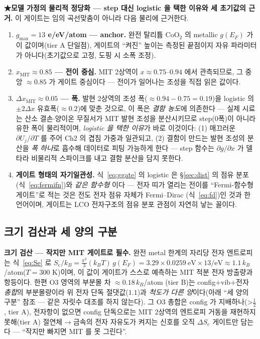 \textbf{★모델 가정의 물리적 정당화 --- step 대신 logistic 을 택한 이유와 세 초기값의 근거.} 이 게이트는 임의 곡선맞춤이 아니라
다음 물리에 근거한다.
\begin{enumerate}[label=(\roman*),leftmargin=2.2em,itemsep=2pt]
\item \textbf{$g_{\max}=13$ e/eV/atom --- anchor.} 완전 탈리튬 $\mathrm{CoO_2}$ 의 metallic $g(E_F)$ 가 이 값이며(tier A 단일점)\cite{motohashi2009}, 게이트의
``켜진'' 높이는 측정된 끝점이지 자유 파라미터가 아니다(초기값으로 고정, 도핑 시 소폭 조정).
\item \textbf{$x_\mathrm{MIT}\approx0.85$ --- 전이 중심.} MIT 2상역이 $x\approx0.75$--$0.94$ 에서 관측되므로\cite{menetrier1999,reimers1992},
그 중앙 $\approx0.85$ 가 게이트 중심이다 --- 전이가 일어나는 조성을 직접 읽은 값이다.
\item \textbf{$\Delta x_\mathrm{MIT}\approx0.05$ --- 폭.} 발현 2상역의 조성 폭($\approx0.94{-}0.75=0.19$)을 logistic 의 $\pm2\Delta x$ 유효폭($\approx0.2$)에 맞춘
것으로, 이 폭은 \emph{결함 농도}에 의존한다 --- 실제 시료는 산소 결손$\cdot$양이온 무질서가 MIT 발현 조성을
분산시키므로 step(0폭)이 아니라 유한 폭이 물리적이며, \emph{logistic 을 택한 이유}가 바로 이것이다: (1) 매끄러운
$\partial U_j/\partial T$ 를 주어 Ch2 의 겹침 가중과 일관되고, (2) 결함이 만드는 발현 조성의 분산을 \emph{폭
하나}로 흡수해 데이터로 피팅 가능하게 한다 --- step 함수는 $\partial g/\partial x$ 가 델타라 비물리적 스파이크를
내고 결함 분산을 담지 못한다.
\item \textbf{게이트 형태의 자기일관성.} 식~\eqref{eq:ggate} 의 logistic 은 \S\ref{sec:dist} 의 점유 분포(식~\eqref{eq:fermifn})와 \emph{같은 함수형}
이다 --- 전자 띠가 열리는 전이를 ``Fermi-함수형 게이트''로 적는 것은 전도 전자 점유 자체가 Fermi--Dirac
(식~\eqref{eq:fd})인 것과 한 언어이며, 게이트는 LCO 전자구조의 점유 분포 관점이 자연히 낳는 꼴이다.
\end{enumerate}

\subsection{크기 검산과 세 양의 구분}\label{sec:lco-Se-scale}
\textbf{크기 검산 --- 작지만 MIT 게이트로 필수.} 완전 metal 한계의 자리당 전자 엔트로피는 식~\eqref{eq:Se} 로 $S_e/k_B=\tfrac{\pi^2}{3}(k_BT)\,g(E_F)
=3.29\times0.0259\ \mathrm{eV}\times13/\mathrm{eV}\approx1.1\,k_B$/atom($T{=}300$ K)이며, 이 값이 게이트가
스스로 예측하는 MIT 적분 전자 방출량과 항등이다. 한편 O3 영역의 부분몰 차 $\approx0.18\,k_B$/atom
\cite{reynier2004}(tier B)는 config$+$vib$+$전자 \emph{총합}의 부분몰량이라 위 전자 단독 절댓값($1.1$)과
\emph{척도가 다른 양}이다(아래 ``세 양의 구분'' 참조 --- 같은 자릿수 대조를 하지 않는다). 그 O3 총합은 config 가
지배하나(>$\tfrac12$\cite{reynier2004}, tier A), 전자항이 없으면 config 단독으로는 MIT 2상역의 엔트로피 거동을
재현하지 못해\cite{ml2024}(tier A) 절연체$\to$금속의 전자 자유도가 켜지는 신호를 오직 $\Delta S_e$ 게이트만
담는다 --- ``작지만 빠지면 MIT 를 못 그린다''.

